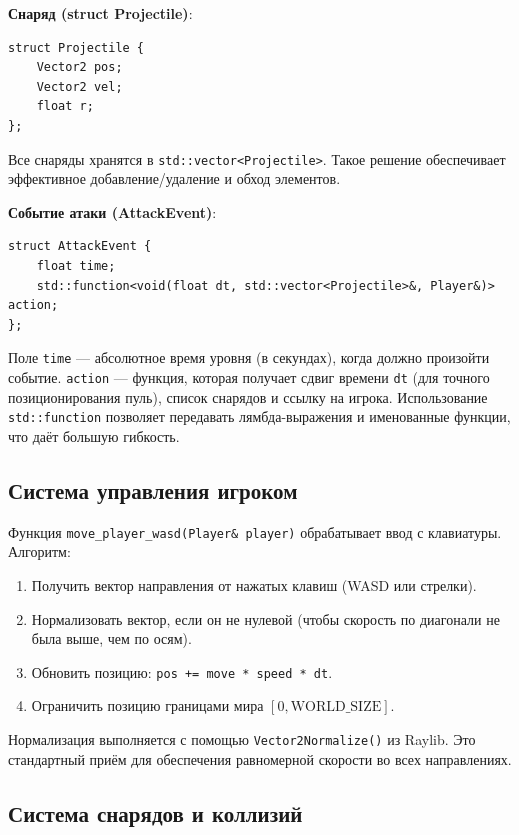 \documentclass[../main.tex]{subfiles}
\begin{document}
\textbf{Снаряд (struct Projectile)}:
\begin{lstlisting}[caption={Структура Projectile из game.h}]
struct Projectile {
	Vector2 pos;
	Vector2 vel;
	float r;
};
\end{lstlisting}

Все снаряды хранятся в \texttt{std::vector<Projectile>}. Такое решение обеспечивает эффективное добавление/удаление и обход элементов.

\textbf{Событие атаки (AttackEvent)}:
\begin{lstlisting}[caption={Структура AttackEvent из game.h}]
struct AttackEvent {
	float time;
	std::function<void(float dt, std::vector<Projectile>&, Player&)> action;
};
\end{lstlisting}

Поле \texttt{time} — абсолютное время уровня (в секундах), когда должно произойти событие. \texttt{action} — функция, которая получает сдвиг времени \texttt{dt} (для точного позиционирования пуль), список снарядов и ссылку на игрока. Использование \texttt{std::function} позволяет передавать лямбда-выражения и именованные функции, что даёт большую гибкость.

\subsection{Система управления игроком}

Функция \texttt{move\_player\_wasd(Player\& player)} обрабатывает ввод с клавиатуры. Алгоритм:
\begin{enumerate}
	\item Получить вектор направления от нажатых клавиш (WASD или стрелки).
	\item Нормализовать вектор, если он не нулевой (чтобы скорость по диагонали не была выше, чем по осям).
	\item Обновить позицию: \texttt{pos += move * speed * dt}.
	\item Ограничить позицию границами мира $[0, \text{WORLD\_SIZE}]$.
\end{enumerate}

Нормализация выполняется с помощью \texttt{Vector2Normalize()} из Raylib. Это стандартный приём для обеспечения равномерной скорости во всех направлениях.

\subsection{Система снарядов и коллизий}
\end{document}
